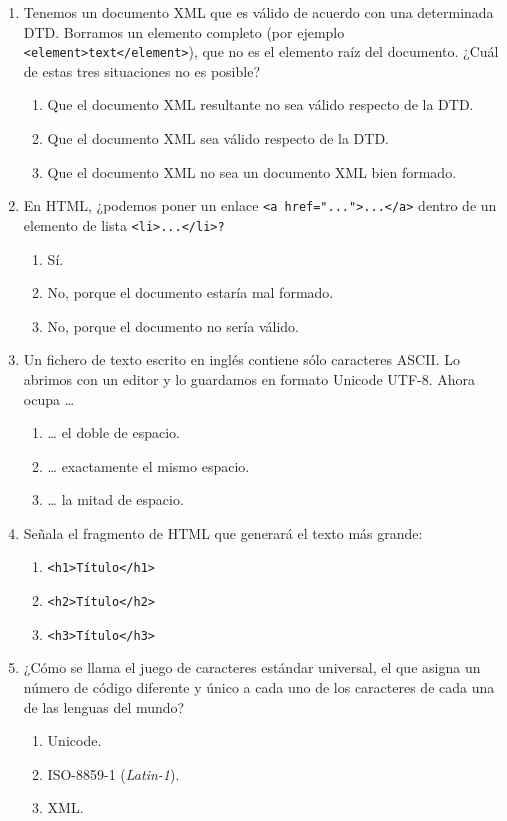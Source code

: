 \begin{enumerate}
\item Tenemos un documento XML que es válido de acuerdo con una determinada DTD. Borramos un elemento completo (por ejemplo \texttt{<element>text</element>}), que no es el elemento raíz del documento. ¿Cuál de estas tres situaciones no es posible? \begin{enumerate} \item Que el documento XML resultante no sea válido respecto de la DTD. \item Que el documento XML sea válido respecto de la DTD. \item Que el documento XML no sea un documento XML bien formado. \end{enumerate} 

\item En HTML, ¿podemos poner un enlace \texttt{<a href="..."}\texttt{>...</a>} dentro de un elemento de lista \texttt{<li>...</li>?} \begin{enumerate} \item Sí. \item No, porque el documento estaría mal formado. \item No, porque el documento no sería válido. \end{enumerate} 

\item Un fichero de texto escrito en inglés contiene sólo caracteres ASCII. Lo abrimos con un editor y lo guardamos en formato Unicode UTF-8. Ahora ocupa {\ldots} \begin{enumerate} \item {\ldots} el doble de espacio. \item {\ldots} exactamente el mismo espacio. \item {\ldots} la mitad de espacio. \end{enumerate} 

\item Señala el fragmento de HTML que generará el texto más grande: \begin{enumerate} \item \texttt{<h1>Título</h1>} \item \texttt{<h2>Título</h2>} \item \texttt{<h3>Título</h3>} \end{enumerate} 

\item ¿Cómo se llama el juego de caracteres estándar universal, el que asigna un número de código diferente y único a cada uno de los caracteres de cada una de las lenguas del mundo? \begin{enumerate} \item Unicode. \item ISO-8859-1 (\emph{Latin-1}). \item XML. \end{enumerate} 


\end{enumerate}
